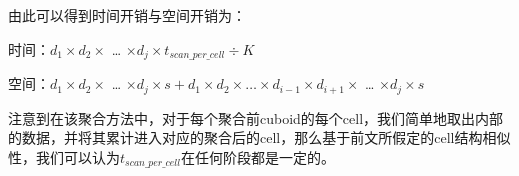 由此可以得到时间开销与空间开销为：

时间：$d_1 \times d_2 \times$ … $\times d_j \times t_{scan\_per\_cell} \div K$

空间：$d_1 \times d_2 \times$ … $\times d_j \times s + d_1 \times d_2 \times … \times d_{i-1} \times d_{i+1} \times$ … $\times d_j \times s$

注意到在该聚合方法中，对于每个聚合前cuboid的每个cell，我们简单地取出内部的数据，并将其累计进入对应的聚合后的cell，那么基于前文所假定的cell结构相似性，我们可以认为$t_{scan\_per\_cell}$在任何阶段都是一定的。

